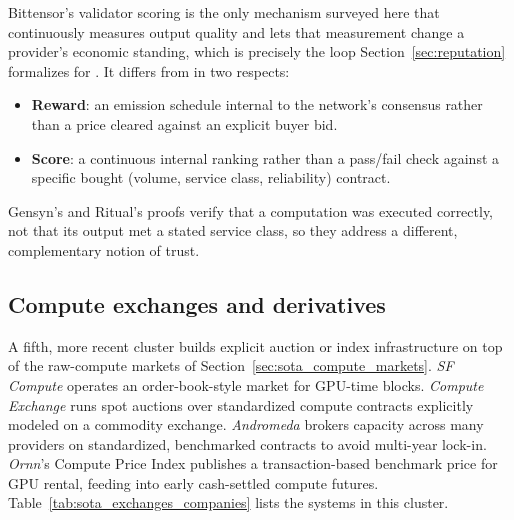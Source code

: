 Bittensor's validator scoring is the only mechanism surveyed here that
continuously measures output quality and lets that measurement change a
provider's economic standing, which is precisely the loop
Section~\ref{sec:reputation} formalizes for \NoesisMarket. It differs from
\Noesis{} in two respects:

\begin{itemize}
  \item \textbf{Reward}: an emission schedule internal to the network's
    consensus rather than a price cleared against an explicit buyer bid.
  \item \textbf{Score}: a continuous internal ranking rather than a pass/fail
    check against a specific bought (volume, service class, reliability)
    contract.
\end{itemize}

Gensyn's and Ritual's proofs verify that a
computation was executed correctly, not that its output met a stated
service class, so they address a different, complementary
notion of trust.

\subsection{Compute exchanges and derivatives}
\label{sec:sota_exchanges}

A fifth, more recent cluster builds explicit auction or index
infrastructure on top of the raw-compute markets of
Section~\ref{sec:sota_compute_markets}. \emph{SF Compute} operates an
order-book-style market for GPU-time blocks. \emph{Compute Exchange} runs
spot auctions over standardized compute contracts explicitly modeled on a
commodity exchange. \emph{Andromeda} brokers capacity across many
providers on standardized, benchmarked contracts to avoid multi-year
lock-in. \emph{Ornn}'s Compute Price Index publishes a transaction-based
benchmark price for GPU rental, feeding into early cash-settled compute
futures.
Table~\ref{tab:sota_exchanges_companies} lists the systems in this cluster.

